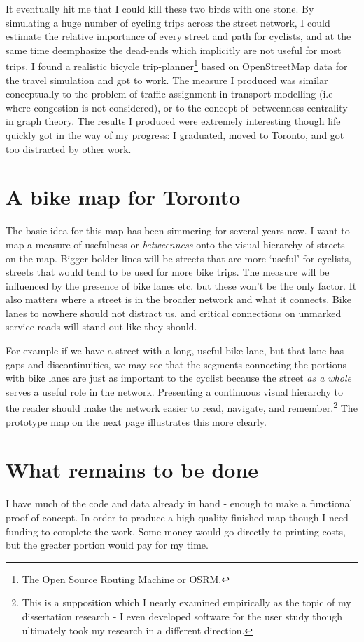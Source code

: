 \documentclass{article}
\begin{document}
		It eventually hit me that I could kill these two birds with one stone. By simulating a huge number of cycling trips across the street network, I could estimate the relative importance of every street and path for cyclists, and at the same time deemphasize the dead-ends which implicitly are not useful for most trips.
		I found a realistic bicycle trip-planner\footnote{The Open Source Routing Machine or OSRM.} based on OpenStreetMap data for the travel simulation and got to work. 
		The measure I produced was similar conceptually to the problem of traffic assignment in transport modelling (i.e where congestion is not considered), or to the concept of betweenness centrality in graph theory.
		The results I produced were extremely interesting though life quickly got in the way of my progress: I graduated, moved to Toronto, and got too distracted by other work.
		
	\section*{A bike map for Toronto}
		The basic idea for this map has been simmering for several years now. I want to map a measure of usefulness or \textit{betweenness} onto the visual hierarchy of streets on the map. Bigger bolder lines will be streets that are more `useful' for cyclists, streets that would tend to be used for more bike trips. The measure will be influenced by the presence of bike lanes etc. but these won't be the only factor. It also matters where a street is in the broader network and what it connects. Bike lanes to nowhere should not distract us, and critical connections on unmarked service roads will stand out like they should. 
		
		For example if we have a street with a long, useful bike lane, but that lane has gaps and discontinuities, we may see that the segments connecting the portions with bike lanes are just as important to the cyclist because the street \textit{as a whole} serves a useful role in the network. 
		Presenting a continuous visual hierarchy to the reader should make the network easier to read, navigate, and remember.\footnote{
			This is a supposition which I nearly examined empirically as the topic of my dissertation research - I even developed software for the user study though ultimately took my research in a different direction.
		}
		The prototype map on the next page illustrates this more clearly. 
	
	\section*{What remains to be done}
		I have much of the code and data already in hand - enough to make a functional proof of concept. In order to produce a high-quality finished map though I need funding to complete the work.
		Some money would go directly to printing costs, but the greater portion would pay for my time.
		
\end{document}
